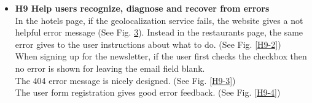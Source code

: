 \begin{itemize}
\begin{figure}[!ht]
\begin{minipage}{\linewidth}
                \captionsetup{justification=centering}
                \caption{}
                \label{H8-1}
            \end{minipage}
\end{figure}
\begin{figure}[!ht]
    \begin{minipage}{\linewidth}
        \centering
        \captionsetup{justification=centering}
        \caption{}
        \label{H8-2}
    \end{minipage}
\end{figure}
    \item \textbf{H9 Help users recognize, diagnose and recover from errors}\\
    In the hotels page, if the geolocalization service fails, the website gives a not helpful error message (See Fig. \ref{H9-1}). Instead in the restaurants page, the same error gives to the user instructions about what to do. (See Fig. \ref{H9-2})\\
    When signing up for the newsletter, if the user first checks the checkbox then no error is shown for leaving the email field blank.\\
    The 404 error message is nicely designed. (See Fig. \ref{H9-3})\\
    The user form registration gives good error feedback. (See Fig. \ref{H9-4})
\begin{figure}[!ht]
        \begin{minipage}{\linewidth}
            \centering
            \captionsetup{justification=centering}
            \caption{}
            \label{H9-1}
        \end{minipage}
\end{figure}
\begin{figure}[!ht]

\end{figure}
\end{itemize}

